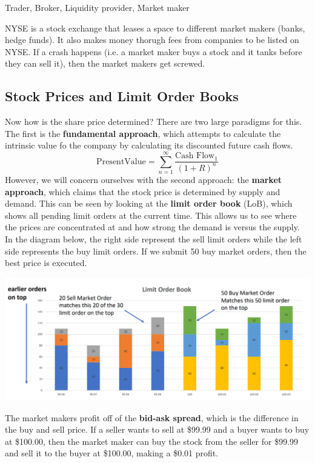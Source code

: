 \documentclass{article}
\begin{document}
    Trader, Broker, Liquidity provider, Market maker 

    NYSE is a stock exchange that leases a space to different market makers (banks, hedge funds). It also makes money thorugh fees from companies to be listed on NYSE. If a crash happens (i.e. a market maker buys a stock and it tanks before they can sell it), then the market makers get screwed. 

  \subsection{Stock Prices and Limit Order Books}

    Now how is the share price determined? There are two large paradigms for this. The first is the \textbf{fundamental approach}, which attempts to calculate the intrinsic value fo the company by calculating its discounted future cash flows. 
    \[\mathrm{Present Value} = \sum_{n=1}^\infty \frac{\text{Cash Flow}_1}{(1 + R)^n}\]
    However, we will concern ourselves with the second approach: the \textbf{market approach}, which claims that the stock price is determined by supply and demand. This can be seen by looking at the \textbf{limit order book} (LoB), which shows all pending limit orders at the current time. This allows us to see where the prices are concentrated at and how strong the demand is versus the supply. In the diagram below, the right side represent the sell limit orders while the left side represents the buy limit orders. If we submit 50 buy market orders, then the best price is executed. 
    \begin{center}
        \includegraphics[scale=0.3]{img/limit_order_book.png}
    \end{center}
    The market makers profit off of the \textbf{bid-ask spread}, which is the difference in the buy and sell price. If a seller wants to sell at \$99.99 and a buyer wants to buy at \$100.00, then the market maker can buy the stock from the seller for \$99.99 and sell it to the buyer at \$100.00, making a \$0.01 profit. 
\end{document}
